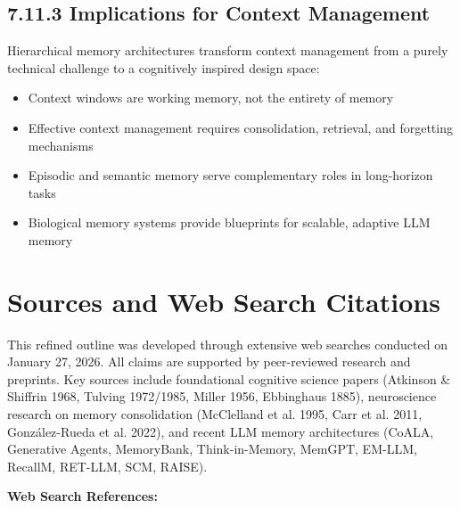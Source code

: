 \documentclass[11pt,letterpaper]{article}
\begin{document}
\subsection{7.11.3 Implications for Context Management}

Hierarchical memory architectures transform context management from a purely technical challenge to a cognitively inspired design space:

\begin{itemize}[leftmargin=*]
    \item Context windows are working memory, not the entirety of memory
    \item Effective context management requires consolidation, retrieval, and forgetting mechanisms
    \item Episodic and semantic memory serve complementary roles in long-horizon tasks
    \item Biological memory systems provide blueprints for scalable, adaptive LLM memory
\end{itemize}

\section*{\color{garnet}Sources and Web Search Citations}

This refined outline was developed through extensive web searches conducted on January 27, 2026. All claims are supported by peer-reviewed research and preprints. Key sources include foundational cognitive science papers (Atkinson \& Shiffrin 1968, Tulving 1972/1985, Miller 1956, Ebbinghaus 1885), neuroscience research on memory consolidation (McClelland et al. 1995, Carr et al. 2011, González-Rueda et al. 2022), and recent LLM memory architectures (CoALA, Generative Agents, MemoryBank, Think-in-Memory, MemGPT, EM-LLM, RecallM, RET-LLM, SCM, RAISE).

\vspace{0.5cm}

\noindent\textbf{Web Search References:}
\end{document}
